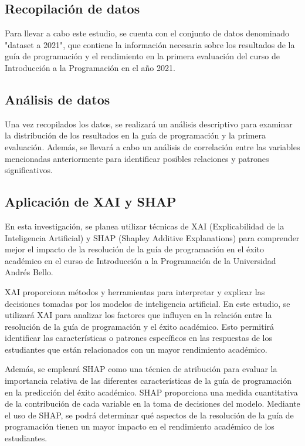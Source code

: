 \subsection{Recopilación de datos}

Para llevar a cabo este estudio, se cuenta con el conjunto de datos denominado "dataset a 2021", que contiene la información necesaria sobre los
resultados de la guía de programación y el rendimiento en la primera evaluación del curso de Introducción a la Programación en el año 2021.


\subsection{Análisis de datos}

Una vez recopilados los datos, se realizará un análisis descriptivo para examinar la distribución de los resultados en la guía de programación y la primera evaluación. Además, se llevará a cabo un análisis de correlación entre las variables mencionadas anteriormente para identificar posibles
relaciones y patrones significativos.

\subsection{Aplicación de XAI y SHAP}

En esta investigación, se planea utilizar técnicas de XAI (Explicabilidad de la Inteligencia Artificial) y SHAP (Shapley Additive Explanations) para comprender mejor el impacto de la resolución de la guía de programación en el éxito académico en el curso de Introducción a la Programación de la Universidad Andrés Bello.

XAI proporciona métodos y herramientas para interpretar y explicar las decisiones tomadas por los modelos de inteligencia artificial. En este estudio, se utilizará XAI para analizar los factores que influyen en la relación entre la resolución de la guía de programación y el éxito académico. Esto permitirá identificar las características o patrones específicos en las respuestas de los estudiantes que están relacionados con un mayor rendimiento académico.

Además, se empleará SHAP como una técnica de atribución para evaluar la importancia relativa de las diferentes características de la guía de programación en la predicción del éxito académico. SHAP proporciona una medida cuantitativa de la contribución de cada variable en la toma de decisiones del modelo. Mediante el uso de SHAP, se podrá determinar qué aspectos de la resolución de la guía de programación tienen un mayor impacto en el rendimiento académico de los estudiantes.

